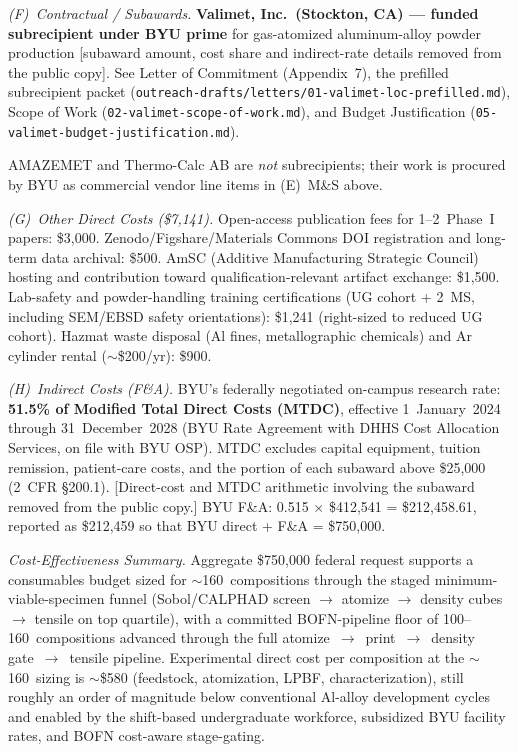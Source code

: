 \documentclass[11pt,letterpaper]{article}
\begin{document}
\textit{(F)~Contractual / Subawards.}
\textbf{Valimet, Inc.\ (Stockton, CA) --- funded subrecipient
under BYU prime} for gas-atomized aluminum-alloy powder production [subaward amount, cost share and indirect-rate details removed from the public copy]. See Letter of Commitment (Appendix~7),
the prefilled subrecipient packet
(\texttt{outreach-drafts/letters/01-valimet-loc-prefilled.md}), Scope of
Work (\texttt{02-valimet-scope-of-work.md}), and Budget Justification
(\texttt{05-valimet-budget-justification.md}).

AMAZEMET and Thermo-Calc AB are \emph{not} subrecipients; their work is
procured by BYU as commercial vendor line items in (E)~M\&S above.

\textit{(G)~Other Direct Costs (\$7{,}141).}
Open-access publication fees for 1--2~Phase~I papers: \$3,000.
Zenodo/Figshare/Materials Commons DOI registration and long-term data
archival: \$500.
AmSC (Additive Manufacturing Strategic Council) hosting and contribution
toward qualification-relevant artifact exchange: \$1,500.
Lab-safety and powder-handling training certifications (UG cohort + 2~MS,
including SEM/EBSD safety orientations): \$1,241 (right-sized to reduced
UG cohort).
Hazmat waste disposal (Al fines, metallographic chemicals) and Ar cylinder
rental ($\sim$\$200/yr): \$900.

\textit{(H)~Indirect Costs (F\&A).}
BYU's federally negotiated on-campus research rate: \textbf{51.5\% of Modified
Total Direct Costs (MTDC)}, effective 1~January~2024 through 31~December~2028
(BYU Rate Agreement with DHHS Cost Allocation Services, on file with BYU OSP).
MTDC excludes capital equipment, tuition remission, patient-care costs, and
the portion of each subaward above \$25{,}000 (2~CFR \S200.1).
[Direct-cost and MTDC arithmetic involving the subaward removed from the public copy.]
BYU F\&A: 0.515 $\times$ \$412{,}541 = \$212{,}458.61, reported as
\$212{,}459 so that BYU direct + F\&A = \$750{,}000.

\textit{Cost-Effectiveness Summary.}
Aggregate \$750{,}000 federal request supports a consumables budget sized
for $\sim$160~compositions through the staged minimum-viable-specimen funnel
(Sobol/CALPHAD screen $\to$ atomize $\to$ density cubes $\to$ tensile on
top quartile), with a committed BOFN-pipeline floor of 100--160~compositions
advanced through the full atomize~$\to$~print~$\to$~density gate~$\to$~tensile
pipeline.  Experimental direct cost per composition at the $\sim$160~sizing
is $\sim$\$580 (feedstock, atomization, LPBF, characterization), still
roughly an order of magnitude below conventional Al-alloy development
cycles and enabled by the shift-based undergraduate workforce, subsidized
BYU facility rates, and BOFN cost-aware stage-gating.
\end{document}
